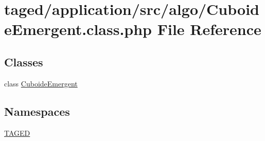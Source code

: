 \hypertarget{_cuboide_emergent_8class_8php}{}\section{taged/application/src/algo/\+Cuboide\+Emergent.class.\+php File Reference}
\label{_cuboide_emergent_8class_8php}
\subsection*{Classes}
\begin{DoxyCompactItemize}
\item 
class \hyperlink{class_cuboide_emergent}{Cuboide\+Emergent}
\end{DoxyCompactItemize}
\subsection*{Namespaces}
\begin{DoxyCompactItemize}
\item 
 \hyperlink{namespace_t_a_g_e_d}{T\+A\+G\+ED}
\end{DoxyCompactItemize}
